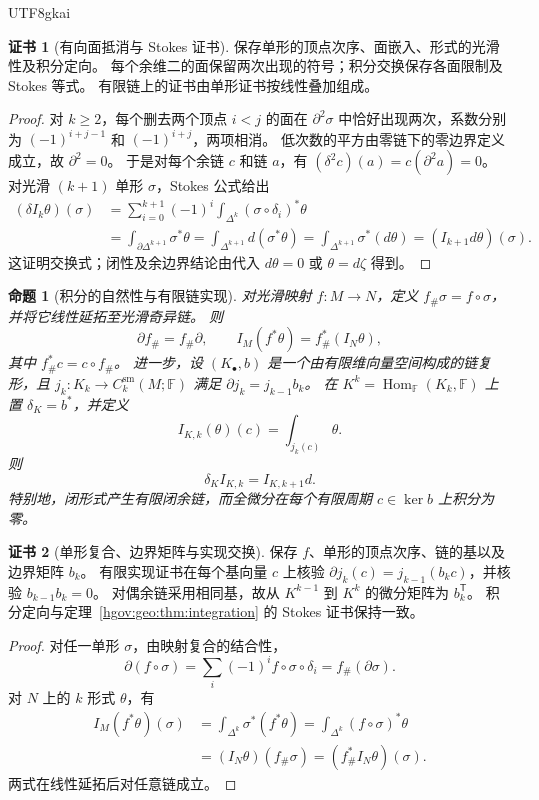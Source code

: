 \documentclass[12pt,a4paper,openany,notitlepage]{report}
\theoremstyle{plain}
\newtheorem{proposition}[theorem]{命题}
\theoremstyle{definition}
\newtheorem*{certificate}{证书}
\theoremstyle{remark}
\begin{document}
\begin{CJK*}{UTF8}{gkai}
\begin{certificate}[有向面抵消与 Stokes 证书]
保存单形的顶点次序、面嵌入、形式的光滑性及积分定向。
每个余维二的面保留两次出现的符号；积分交换保存各面限制及 Stokes 等式。
有限链上的证书由单形证书按线性叠加组成。
\end{certificate}

\begin{proof}
对 $k\ge2$，每个删去两个顶点 $i<j$ 的面在 $\partial^2\sigma$ 中恰好出现两次，系数分别为
$(-1)^{i+j-1}$ 和 $(-1)^{i+j}$，两项相消。
低次数的平方由零链下的零边界定义成立，故 $\partial^2=0$。
于是对每个余链 $c$ 和链 $a$，有
$(\delta^2c)(a)=c(\partial^2a)=0$。
对光滑 $(k+1)$ 单形 $\sigma$，Stokes 公式给出
\[
\begin{aligned}
(\delta I_k\theta)(\sigma)
&=\sum_{i=0}^{k+1}(-1)^i
\int_{\Delta^k}(\sigma\circ\delta_i)^*\theta\\
&=\int_{\partial\Delta^{k+1}}\sigma^*\theta
=\int_{\Delta^{k+1}}d(\sigma^*\theta)
=\int_{\Delta^{k+1}}\sigma^*(d\theta)
=(I_{k+1}d\theta)(\sigma).
\end{aligned}
\]
这证明交换式；闭性及余边界结论由代入 $d\theta=0$ 或 $\theta=d\zeta$ 得到。
\end{proof}

\begin{proposition}[积分的自然性与有限链实现]
\label{exp:geo:prop:integration-naturality}
对光滑映射 $f:M\to N$，定义
$f_\#\sigma=f\circ\sigma$，并将它线性延拓至光滑奇异链。
则
\[
\partial f_\#=f_\#\partial,
\qquad
I_M(f^*\theta)=f_\#^*(I_N\theta),
\]
其中 $f_\#^*c=c\circ f_\#$。
进一步，设 $(K_\bullet,b)$ 是一个由有限维向量空间构成的链复形，且
$j_k:K_k\to C_k^{\mathrm{sm}}(M;\mathbb F)$ 满足
$\partial j_k=j_{k-1}b_k$。
在 $K^k=\operatorname{Hom}_{\mathbb F}(K_k,\mathbb F)$ 上置
$\delta_K=b^*$，并定义
\[
I_{K,k}(\theta)(c)=\int_{j_k(c)}\theta.
\]
则
\[
\delta_K I_{K,k}=I_{K,k+1}d.
\]
特别地，闭形式产生有限闭余链，而全微分在每个有限周期 $c\in\ker b$ 上积分为零。
\end{proposition}
\begin{certificate}[单形复合、边界矩阵与实现交换]
保存 $f$、单形的顶点次序、链的基以及边界矩阵 $b_k$。
有限实现证书在每个基向量 $c$ 上核验
$\partial j_k(c)=j_{k-1}(b_kc)$，并核验 $b_{k-1}b_k=0$。
对偶余链采用相同基，故从 $K^{k-1}$ 到 $K^k$ 的微分矩阵为 $b_k^{\mathsf T}$。
积分定向与定理~\ref{hgov:geo:thm:integration} 的 Stokes 证书保持一致。
\end{certificate}
\begin{proof}
对任一单形 $\sigma$，由映射复合的结合性，
\[
\partial(f\circ\sigma)
=\sum_i(-1)^if\circ\sigma\circ\delta_i
=f_\#(\partial\sigma).
\]
对 $N$ 上的 $k$ 形式 $\theta$，有
\[
\begin{aligned}
I_M(f^*\theta)(\sigma)
&=\int_{\Delta^k}\sigma^*(f^*\theta)
=\int_{\Delta^k}(f\circ\sigma)^*\theta\\
&=(I_N\theta)(f_\#\sigma)
=(f_\#^*I_N\theta)(\sigma).
\end{aligned}
\]
两式在线性延拓后对任意链成立。


\end{proof}
\end{CJK*}
\end{document}
